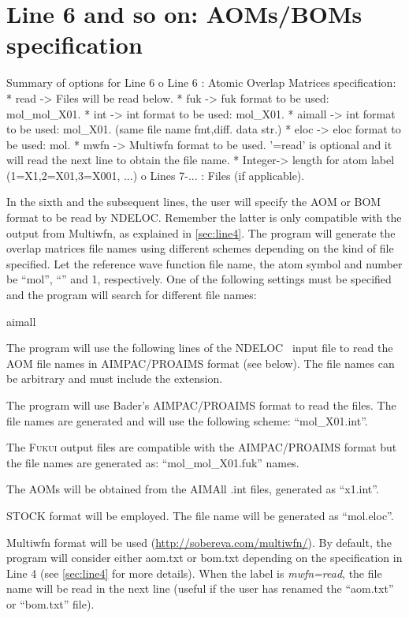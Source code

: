 \documentclass[a4paper,11pt,openany]{memoir}
\newcommand\programa{\textsc{NDELOC}}
\begin{document}
\section[Line 6 and so on: \acsp{AOM}/\acsp{BOM} specification]{Line 6 and so on: \acp{AOM}/\acp{BOM} specification}\label{sec:line6}
\begin{recuadro}{Summary of options for Line 6}
o Line 6      : Atomic Overlap Matrices specification:
 *  read   -> Files will be read below.
 *  fuk    -> fuk format to be used: mol_mol_X01.
 *  int    -> int format to be used: mol_X01.
 *  aimall -> int format to be used: mol_X01.
              (same file name fmt,diff. data str.)
 *  eloc   -> eloc format to be used: mol.
 *  mwfn   -> Multiwfn format to be used. '=read' is optional and it will read
              the next line to obtain the file name.                              
 *  Integer-> length for atom label (1=X1,2=X01,3=X001, ...)
o Lines 7-... : Files (if applicable).
\end{recuadro}
In the sixth and the subsequent lines, the user will specify the \ac{AOM} or \acf{BOM} format to be read by \programa. Remember the latter is only compatible with the output from Multiwfn, as explained in \autoref{sec:line4}. The program will generate the overlap matrices file names using different schemes depending on the kind of file specified. Let the reference wave function file name, the atom symbol and number be ``mol'', ``'' and 1, respectively. One of the following settings must be specified and the program will search for different file names:
\begin{labeling}{aimall}
	\item[read] The program will use the following lines of the \programa~ input file to read the \ac{AOM} file names in AIMPAC/PROAIMS format (see below). The file names can be arbitrary and must include the extension.
	\item[int] The program will use Bader's AIMPAC/PROAIMS format to read the files. The file names are generated and will use the following scheme: ``mol\_X01.int''.
	\item[fuk] The \textsc{Fukui} output files are compatible with the AIMPAC/PROAIMS format but the file names are generated as: ``mol\_mol\_X01.fuk'' names.
	\item[aimall] The \acp{AOM} will be obtained from the AIMAll .int files, generated as ``x1.int''.
	\item[eloc] STOCK format will be employed. The file name will be generated as ``mol.eloc''.
	\item[mwfn] Multiwfn format will be used (\url{http://sobereva.com/multiwfn/}). By default, the program will consider either aom.txt or bom.txt depending on the specification in Line 4 (see \autoref{sec:line4} for more details). When the label is \emph{mwfn=read}, the file name will be read in the next line (useful if the user has renamed the ``aom.txt'' or ``bom.txt'' file).
\end{labeling}
\end{document}
